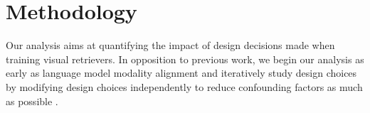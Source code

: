 \section{Methodology}\label{sec:methodology}



Our analysis aims at quantifying the impact of design decisions made when training visual retrievers. In opposition to previous work, we begin our analysis as early as language model modality alignment and iteratively study design choices by modifying design choices independently to reduce confounding factors as much as possible \citep{allenzhu2025physicslanguagemodels1}.


